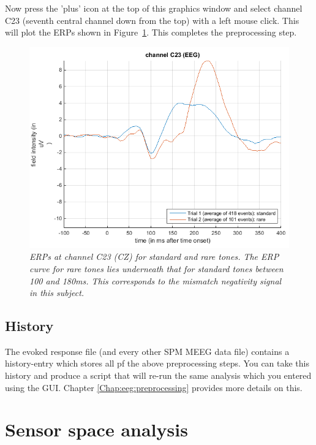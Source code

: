 Now press the 'plus' icon at the top of this graphics window and select channel C23 (seventh central channel down from the top) with a left mouse click. This will plot the ERPs shown in Figure~\ref{c23}. This completes the preprocessing step.
\begin{figure}
\begin{center}
\includegraphics[width=120mm]{mmn/erp_c23}
\caption{\em ERPs at channel C23 (CZ) for standard and rare tones. The ERP curve for rare tones lies underneath that for standard tones between 100 and 180ms. This corresponds to the mismatch negativity signal in this subject. \label{c23}}
\end{center}
\end{figure}

\subsection{History}
The evoked response file (and every other SPM MEEG data file) contains a history-entry which stores all pf the above preprocessing steps. You can take this history and produce a script that will re-run the same analysis which you entered using the GUI. Chapter \ref{Chap:eeg:preprocessing} provides more details on this.

\section{Sensor space analysis}



